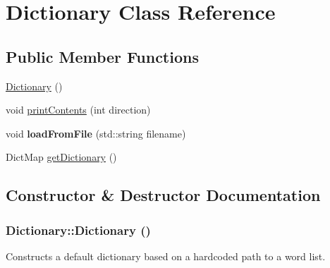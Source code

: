 \hypertarget{classDictionary}{
\section{Dictionary Class Reference}
\label{classDictionary}
}
\subsection*{Public Member Functions}
\begin{DoxyCompactItemize}
\item 
\hyperlink{classDictionary_aee8d612bc9d323c38faba045ba384b8b}{Dictionary} ()
\item 
void \hyperlink{classDictionary_ac233f319ff9eab7b54269fd1d571e146}{printContents} (int direction)
\item 
\hypertarget{classDictionary_afeca5aa092a92aec62224e720e2304d2}{
void {\bfseries loadFromFile} (std::string filename)}
\label{classDictionary_afeca5aa092a92aec62224e720e2304d2}

\item 
DictMap \hyperlink{classDictionary_a9696c9da75da8f8bfd1a1e2ff071c343}{getDictionary} ()
\end{DoxyCompactItemize}


\subsection{Constructor \& Destructor Documentation}
\hypertarget{classDictionary_aee8d612bc9d323c38faba045ba384b8b}{
\subsubsection[{Dictionary}]{\setlength{\rightskip}{0pt plus 5cm}Dictionary::Dictionary ()}}
\label{classDictionary_aee8d612bc9d323c38faba045ba384b8b}
Constructs a default dictionary based on a hardcoded path to a word list. 

